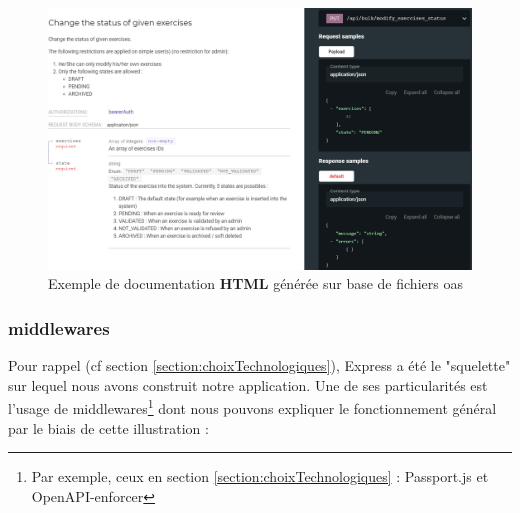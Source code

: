 \begin{figure}[H]
    \includegraphics[width=\textwidth,height=0.44\textheight,keepaspectratio]{images/serveur/doc_example.png}
    \centering
    \caption{Exemple de documentation \textbf{HTML} générée sur base de fichiers \Gls{oas}}
    \label{fig:exampleDoc}
\end{figure}

\pagebreak
\subsubsection{\Glspl{middleware}}

Pour rappel (cf section \ref{section:choixTechnologiques}), Express a été le "squelette" sur lequel nous avons construit notre application.
Une de ses particularités est l'usage de \glspl{middleware}\footnote{
    Par exemple, ceux en section \ref{section:choixTechnologiques} : Passport.js et OpenAPI-enforcer
} dont nous pouvons expliquer le fonctionnement général par le biais de cette illustration :

